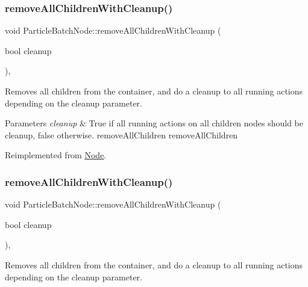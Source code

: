 \subsubsection{\texorpdfstring{remove\+All\+Children\+With\+Cleanup()}{removeAllChildrenWithCleanup()}\hspace{0.1cm}{\footnotesize\ttfamily [1/2]}}
{\footnotesize\ttfamily void Particle\+Batch\+Node\+::remove\+All\+Children\+With\+Cleanup (\begin{DoxyParamCaption}\item[{bool}]{cleanup }\end{DoxyParamCaption})\hspace{0.3cm}{\ttfamily [override]}, {\ttfamily [virtual]}}

Removes all children from the container, and do a cleanup to all running actions depending on the cleanup parameter.


\begin{DoxyParams}{Parameters}
{\em cleanup} & True if all running actions on all children nodes should be cleanup, false otherwise.  remove\+All\+Children  remove\+All\+Children \\
\hline
\end{DoxyParams}


Reimplemented from \hyperlink{classNode_aca66e2b385c3dbf1a6f55627c4a13192}{Node}.

\mbox{\label{classParticleBatchNode_ac4875ff56dadd5f836d9b99a36201bb1}} 
\subsubsection{\texorpdfstring{remove\+All\+Children\+With\+Cleanup()}{removeAllChildrenWithCleanup()}\hspace{0.1cm}{\footnotesize\ttfamily [2/2]}}
{\footnotesize\ttfamily void Particle\+Batch\+Node\+::remove\+All\+Children\+With\+Cleanup (\begin{DoxyParamCaption}\item[{bool}]{cleanup }\end{DoxyParamCaption})\hspace{0.3cm}{\ttfamily [override]}, {\ttfamily [virtual]}}

Removes all children from the container, and do a cleanup to all running actions depending on the cleanup parameter.


